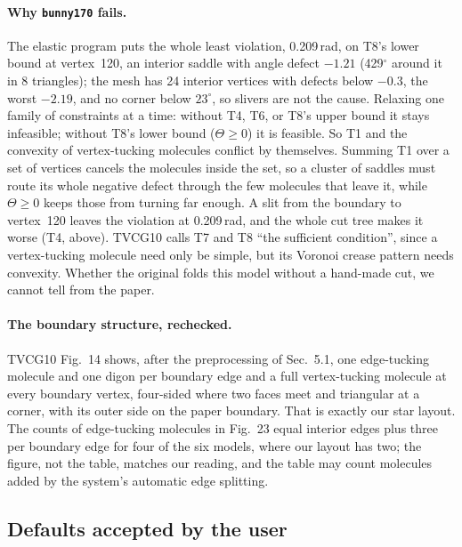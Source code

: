 \documentclass[11pt]{article}
\theoremstyle{definition}
\begin{document}
\paragraph{Why \texttt{bunny170} fails.} The elastic program puts the whole
least violation, 0.209\,rad, on T8's lower bound at vertex~120, an interior
saddle with angle defect $-1.21$ (429$^\circ$ around it in 8 triangles); the
mesh has 24 interior vertices with defects below $-0.3$, the worst $-2.19$,
and no corner below $23^\circ$, so slivers are not the cause. Relaxing one
family of constraints at a time: without T4, T6, or T8's upper bound it stays
infeasible; without T8's lower bound ($\Theta \ge 0$) it is feasible. So T1
and the convexity of vertex-tucking molecules conflict by themselves. Summing
T1 over a set of vertices cancels the molecules inside the set, so a cluster
of saddles must route its whole negative defect through the few molecules
that leave it, while $\Theta \ge 0$ keeps those from turning far enough. A
slit from the boundary to vertex~120 leaves the violation at 0.209\,rad, and
the whole cut tree makes it worse (T4, above). TVCG10 calls T7 and T8 ``the
sufficient condition'', since a vertex-tucking molecule need only be simple,
but its Voronoi crease pattern needs convexity. Whether the original folds
this model without a hand-made cut, we cannot tell from the paper.

\paragraph{The boundary structure, rechecked.} TVCG10 Fig.~14 shows, after
the preprocessing of Sec.~5.1, one edge-tucking molecule and one digon per
boundary edge and a full vertex-tucking molecule at every boundary vertex,
four-sided where two faces meet and triangular at a corner, with its outer
side on the paper boundary. That is exactly our star layout. The counts of
edge-tucking molecules in Fig.~23 equal interior edges plus three per boundary
edge for four of the six models, where our layout has two; the figure, not
the table, matches our reading, and the table may count molecules added by the
system's automatic edge splitting.

\subsection{Defaults accepted by the user}
\end{document}
